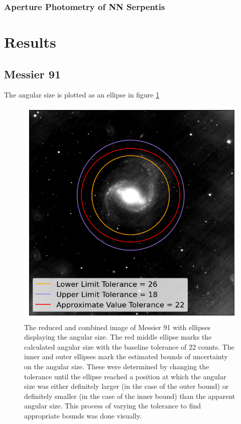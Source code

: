 \documentclass[%
reprint,
amsmath,amssymb,
aps,
]{revtex4-2}
\begin{document}
			\subsubsection{Aperture Photometry of NN Serpentis}
		
	\section{Results}
	
		\subsection{Messier 91}
		
			The angular size is plotted as an ellipse in figure \ref{fig:angSize}
			
			\begin{figure}
				\includegraphics[width=\columnwidth]{angularSize.png}
				\caption{\label{fig:angSize} The reduced and combined image of Messier 91 with ellipses displaying the angular size. The red middle ellipse marks the calculated angular size with the baseline tolerance of 22 counts. The inner and outer ellipses mark the estimated bounds of uncertainty on the angular size. These were determined by changing the tolerance until the ellipse reached a position at which the angular size was either definitely larger (in the case of the outer bound) or definitely smaller (in the case of the inner bound) than the apparent angular size. This process of varying the tolerance to find appropriate bounds was done visually.}
			\end{figure}
			
\end{document}
